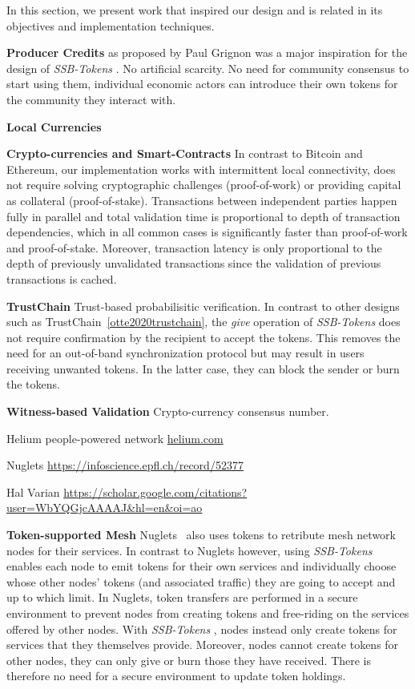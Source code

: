 \documentclass[sigplan,screen,10pt]{acmart}
\newcommand\ssbtokens[0]{\textit{SSB-Tokens} }
\begin{document}
In this section, we present work that inspired our design and is related in its objectives and implementation techniques.

\textbf{Producer Credits} as proposed by Paul Grignon was a major inspiration for the design of \ssbtokens. No artificial scarcity. No need for community consensus to start using them, individual economic actors can introduce their own tokens for the community they interact with.

\textbf{Local Currencies}

\textbf{Crypto-currencies and Smart-Contracts} In contrast to Bitcoin and Ethereum, our implementation works with intermittent local connectivity, does not require solving cryptographic challenges (proof-of-work) or providing capital as collateral (proof-of-stake). Transactions between independent parties happen fully in parallel and total validation time is proportional to depth of transaction dependencies, which in all common cases is significantly faster than proof-of-work and proof-of-stake. Moreover, transaction latency is only proportional to the depth of previously unvalidated transactions since the validation of previous transactions is cached.


\textbf{TrustChain} Trust-based probabilisitic verification.  In contrast to other designs such as TrustChain~\ref{otte2020trustchain}, the \textit{give} operation of \ssbtokens  does not require confirmation by the recipient to accept the tokens. This removes the need for an out-of-band synchronization protocol but may result in users receiving unwanted tokens. In the latter case, they can block the sender or burn the tokens.


\textbf{Witness-based Validation} Crypto-currency consensus number.

Helium people-powered network \url{helium.com}

Nuglets \url{https://infoscience.epfl.ch/record/52377}

Hal Varian \url{https://scholar.google.com/citations?user=WbYQGjcAAAAJ&hl=en&oi=ao}

\textbf{Token-supported Mesh} Nuglets~\cite{buttyan2001nuglets} also uses tokens to retribute mesh network nodes for their services. In contrast to Nuglets however, using \ssbtokens enables each node to emit tokens for their own services and individually choose whose other nodes' tokens (and associated traffic) they are going to accept and up to which limit. In Nuglets, token transfers are performed in a secure environment to prevent nodes from creating tokens and free-riding on the services offered by other nodes. With \ssbtokens, nodes instead only create tokens for services that they themselves provide. Moreover, nodes cannot create tokens for other nodes, they can only give or burn those they have received. There is therefore no need for a secure environment to update token holdings. 
\end{document}
